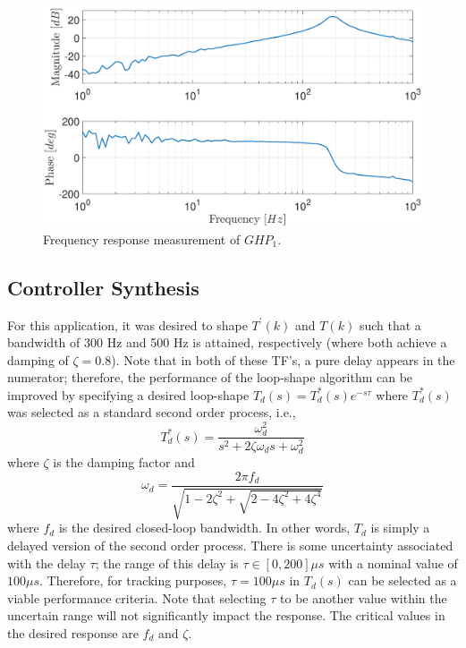 \documentclass[a4paper, 10pt, conference]{ieeeconf}
\begin{document}
\begin{figure}
\centering
\includegraphics[width=\columnwidth]{../pics/GHP1.eps}
\caption{Frequency response measurement of $GHP_1$.}
\label{fig:GHP1}
\end{figure} 

\subsection{Controller Synthesis}
For this application, it was desired to shape $T^{\prime}(k)$ and $T(k)$ such that a bandwidth of 300 Hz and 500 Hz is attained, respectively (where both achieve a damping of $\zeta = 0.8$). Note that in both of these TF's, a pure delay appears in the numerator; therefore, the performance of the loop-shape algorithm can be improved by specifying a desired loop-shape $T_d(s) = T_d^*(s) e^{-s\tau}$ where $T_d^*(s)$ was selected as a standard second order process, i.e.,
\begin{equation}
T_d^*(s) = \frac{\omega_d^2}{s^2 + 2\zeta \omega_d s + \omega_d^2}
\end{equation}
where $\zeta$ is the damping factor and
\begin{equation*}
\omega_d = \frac{2 \pi f_d}{\sqrt{1-2\zeta^2 + \sqrt{2-4\zeta^2 + 4\zeta^4}}}
\end{equation*}
where $f_d$ is the desired closed-loop bandwidth. In other words, $T_d$ is simply a delayed version of the second order process. There is some uncertainty associated with the delay $\tau$; the range of this delay is $\tau \in [0,200]\mu s$ with a nominal value of $100 \mu s$. Therefore, for tracking purposes, $\tau = 100 \mu s$ in $T_d(s)$ can be selected as a viable performance criteria. Note that selecting $\tau$ to be another value within the uncertain range will not significantly impact the response. The critical values in the desired response are $f_d$ and $\zeta$. 
\end{document}
